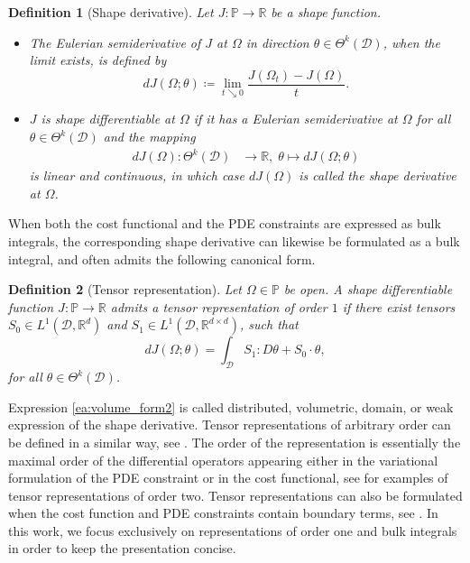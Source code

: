 \documentclass[iicol,pdflatex,sn-mathphys-ay]{sn-jnl}%
\theoremstyle{thmstyleone}%
\theoremstyle{thmstyletwo}%
\theoremstyle{thmstylethree}%
\newtheorem{definition}{Definition}%
\begin{document}
\begin{definition}[Shape derivative]\label{def1}
Let $J:\mathds{P}\to\mathds{R}$ be a shape function.
\begin{itemize}
	\item[(i)] The Eulerian semiderivative of $J$ at $\Omega$
	in direction $\theta \in \Theta^k(\mathcal{D})$, when the limit exists,
	is defined by
	\begin{equation}
		dJ(\Omega ;\theta)\coloneqq
		\lim_{t\searrow 0}\frac{J(\Omega_t)-J(\Omega)}{t}.
	\end{equation}
	\item[(ii)] $J$ is \textit{shape differentiable} at $\Omega$
	if it has a Eulerian semiderivative at $\Omega$ for all
	$\theta\in\Theta^k(\mathcal{D})$ and the mapping
	\begin{align*}
		dJ(\Omega)\colon \Theta^k(\mathcal{D}) & \to \mathds{R},\;
		\theta\mapsto dJ(\Omega ;\theta)
	\end{align*}
	is linear and continuous, in which case $dJ(\Omega)$
	is called the \textit{shape derivative} at $\Omega$.
\end{itemize}
\end{definition}

When both the cost functional and the PDE constraints are expressed
as bulk integrals, the corresponding shape derivative can likewise be
formulated as a bulk integral, and
often admits the following canonical form.

\begin{definition}[Tensor representation]\label{def:tensor2}
	Let $\Omega\in\mathds{P}$ be open.
	A shape differentiable function $J\colon\mathds{P}\to\mathds{R}$ admits
	a tensor representation of order $1$ if
	there exist tensors $S_0\in L^1(\mathcal{D},\mathds{R}^{d})$  and
	$S_1\in L^1(\mathcal{D},\mathds{R}^{d\times d})$, such that
	\begin{equation}\label{ea:volume_form2}
	dJ(\Omega;\theta)=\int_\mathcal{D} S_1 : D\theta +  S_0\cdot \theta,
	\end{equation}
	for all $\theta\in\Theta^k(\mathcal{D})$. 
\end{definition}

Expression \eqref{ea:volume_form2} is called distributed, volumetric, domain,
or weak expression of the shape derivative.
Tensor representations of arbitrary order can be defined in a similar way,
see \cite{MR3535238}.
The order of the representation is essentially the maximal order of
the differential operators appearing either in the variational formulation of
the PDE constraint or in the cost functional, see \cite{MR4531392,LL2024}
for examples of tensor representations of order two. 
Tensor representations can also be formulated when the cost function and
PDE constraints contain boundary terms, see \cite{MR3535238}.
In this work, we focus exclusively on representations of order one and
bulk integrals in order to keep the presentation concise.
\end{document}
